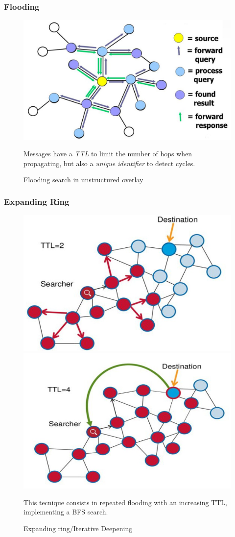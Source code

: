 \subsubsection{Flooding}
\begin{figure}[htbp]
   \centering
   \includegraphics{images/flooding_unstructured.png}
   \caption{Flooding search in unstructured overlay}
   Messages have a \textit{TTL} to limit the number of hops when propagating, but also a \textit{unique identifier} to detect cycles.

   \label{fig:flooding_unstructured}
\end{figure}

\newpage
\subsubsection{Expanding Ring}
\begin{figure}[htbp]
   \centering
   \includegraphics[width=0.45\columnwidth]{images/expandingring2.png}
   \includegraphics[width=0.45\columnwidth]{images/expandingring4.png}
   \caption{Expanding ring/Iterative Deepening}
   This tecnique consists in repeated flooding with an increasing TTL, implementing a BFS search.
   \label{fig:expandingring}
\end{figure}

